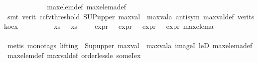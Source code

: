 \begin{isabellebody}
\ \ \ \ \ \ \ \ \isamarkupfalse%
\ {\isachardoublequoteopen}{}{\isachardoublequoteclose}\ \isamarkupfalse%
\ max{\isacharunderscore}{\kern0pt}elem{\isacharunderscore}{\kern0pt}def\ max{\isacharunderscore}{\kern0pt}elem{\isacharunderscore}{\kern0pt}a{\isacharunderscore}{\kern0pt}def\ \isanewline
\ \ \ \ \ \ \ \ \isamarkupfalse%
\ {\isacharparenleft}{\kern0pt}smt\ {\isacharparenleft}{\kern0pt}verit{\isacharcomma}{\kern0pt}\ ccfv{\isacharunderscore}{\kern0pt}threshold{\isacharparenright}{\kern0pt}\ SUP{\isacharunderscore}{\kern0pt}upper\ {\isacartoucheopen}max{\isacharunderscore}{\kern0pt}val\ {\isasymle}\ max{\isacharunderscore}{\kern0pt}val{\isacharunderscore}{\kern0pt}a{\isacartoucheclose}\ antisym\ max{\isacharunderscore}{\kern0pt}val{\isacharunderscore}{\kern0pt}def\ verit{\isacharunderscore}{\kern0pt}sko{\isacharunderscore}{\kern0pt}ex{\isacharprime}{\kern0pt}{\isacharparenright}{\kern0pt}\isanewline
\ \ \ \ \ \ \isamarkupfalse%
\ {\isachardoublequoteopen}{\isasymexists}{\isasymphi}\ {\isasymin}\ xs{\isachardot}{\kern0pt}\ {\isasymexists}{\isasympsi}\ {\isasymin}\ xs{\isachardot}{\kern0pt}\ {\isasymphi}\ {\isasymnoteq}\ {\isasympsi}\ {\isasymand}\ expr{\isacharunderscore}{\kern0pt}{}\ {\isasymphi}\ {\isacharequal}{\kern0pt}\ expr{\isacharunderscore}{\kern0pt}{}\ {\isasympsi}\ {\isasymand}\ expr{\isacharunderscore}{\kern0pt}{}\ {\isasympsi}\ {\isacharequal}{\kern0pt}\ expr{\isacharunderscore}{\kern0pt}{}\ max{\isacharunderscore}{\kern0pt}elem{\isacharunderscore}{\kern0pt}a{\isachardoublequoteclose}\isanewline
\ \ \ \ \ \ \ \ \isamarkupfalse%
\ {\isachardoublequoteopen}{}{\isachardoublequoteclose}\ \isanewline
\ \ \ \ \ \ \ \ \isamarkupfalse%
\ {\isacharparenleft}{\kern0pt}metis\ {\isacharparenleft}{\kern0pt}mono{\isacharunderscore}{\kern0pt}tags{\isacharcomma}{\kern0pt}\ lifting{\isacharparenright}{\kern0pt}\ {\isachardoublequoteopen}{}{\isachardoublequoteclose}\ Sup{\isacharunderscore}{\kern0pt}upper\ {\isacartoucheopen}max{\isacharunderscore}{\kern0pt}val\ {\isasymle}\ max{\isacharunderscore}{\kern0pt}val{\isacharunderscore}{\kern0pt}a{\isacartoucheclose}\ imageI\ leD\ max{\isacharunderscore}{\kern0pt}elem{\isacharunderscore}{\kern0pt}a{\isacharunderscore}{\kern0pt}def\ max{\isacharunderscore}{\kern0pt}elem{\isacharunderscore}{\kern0pt}def\ max{\isacharunderscore}{\kern0pt}val{\isacharunderscore}{\kern0pt}def\ order{\isacharunderscore}{\kern0pt}less{\isacharunderscore}{\kern0pt}le\ someI{\isacharunderscore}{\kern0pt}ex{\isacharparenright}{\kern0pt}\isanewline

\end{isabellebody}
